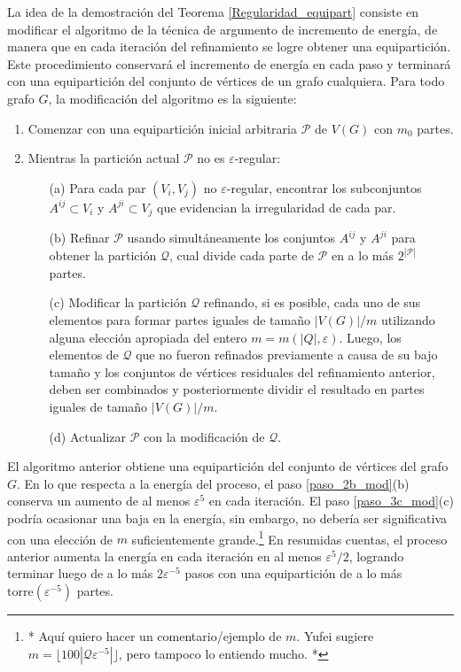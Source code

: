 \documentclass{article}[14pts]
\newcommand{\hh}[1]{{\color{red} * #1 *}}
\let\varepsilon=\varepsilon
\begin{document}
La idea de la demostración del Teorema \ref{Regularidad_equipart} consiste en modificar el algoritmo de la técnica de argumento de incremento de energía, de manera que en cada iteración del refinamiento se logre obtener una equipartición. Este procedimiento conservará el incremento de energía en cada paso y  terminará con una equipartición del conjunto de vértices de un grafo cualquiera. Para todo grafo $G$, la modificación del algoritmo es la siguiente:\medskip



\begin{enumerate}
    \item Comenzar con una equipartición inicial arbitraria $\mathcal{P}$ de $V(G)$ con $m_0$ partes.
    \item Mientras la partición actual $\mathcal{P}$ no es $\varepsilon$-regular:
    \begin{itemize}
        \item[(a)] Para cada par $(V_i, V_j)$ no $\varepsilon$-regular, encontrar los subconjuntos $A^{ij}\subset V_i$ y  $A^{ji}\subset V_j$ que evidencian la irregularidad de cada par.

        \item[(b)] \label{paso_2b_mod} Refinar $\mathcal{P}$ usando simultáneamente los conjuntos $A^{ij}$ y $A^{ji}$ para obtener la partición $\mathcal{Q}$, cual divide cada parte de $\mathcal{P}$ en a lo más $2^{|\mathcal{P}|}$ partes.

        \item[(c)] \label{paso_3c_mod} Modificar la partición $\mathcal{Q}$ refinando, si es posible, cada uno de sus elementos para formar partes iguales de tamaño $|V(G)|/m$ utilizando alguna elección apropiada del entero $m=m(|Q|,\varepsilon)$. Luego, los elementos de $\mathcal{Q}$ que no fueron refinados previamente a causa de su bajo tamaño y los conjuntos de vértices residuales del refinamiento anterior, deben ser combinados y posteriormente dividir el resultado en partes iguales de tamaño $|V(G)|/m$.

        \item[(d)] Actualizar $\mathcal{P}$ con la modificación de $\mathcal{Q}$. 
    \end{itemize}
\end{enumerate}\medskip

El algoritmo anterior obtiene una equipartición del conjunto de vértices del grafo $G$. En lo que respecta a la energía del proceso, el paso \ref{paso_2b_mod}(b) conserva un aumento de al menos $\varepsilon^{5}$ en cada iteración. El paso \ref{paso_3c_mod}(c) podría ocasionar una baja en la energía, sin embargo, no debería ser significativa con una elección de $m$ suficientemente grande.\footnote{\hh{Aquí quiero hacer un comentario/ejemplo de $m$. Yufei sugiere $m= \lfloor 100|\mathcal{Q}\varepsilon^{-5}|\rfloor$, pero tampoco lo entiendo mucho.}} En resumidas cuentas, el proceso anterior aumenta la energía en cada iteración en al menos $\varepsilon^{5}/2$, logrando terminar luego de a lo más $2\varepsilon^{-5}$ pasos con una equipartición de a lo más $\mathrm{torre}(\varepsilon^{-5})$ partes.
\end{document}
